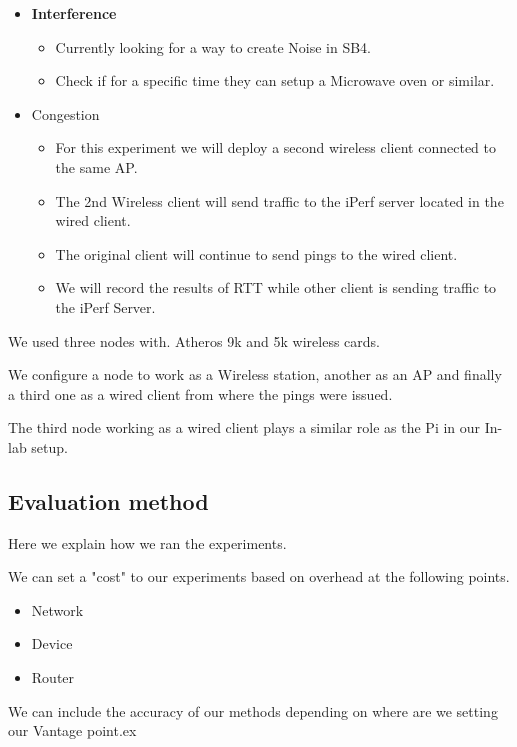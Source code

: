 \begin{itemize}
	\item \textbf{Interference}
	\begin{itemize}
		\item Currently looking for a way to create Noise in SB4.
		\item Check if for a specific time they can setup a Microwave oven or similar.
		
	\end{itemize}
	
	
	
	\item Congestion
	\begin{itemize}
		\item For this experiment we will deploy a second wireless client connected to the same AP.
		\item The 2nd Wireless client will send traffic to the iPerf server located in the wired client.
		\item The original client will continue to send pings to the wired client.
		\item We will record the results of RTT while other client is sending traffic to the iPerf Server.
		
	\end{itemize}
	
	
\end{itemize}


We used three nodes with.
Atheros 9k and 5k wireless cards.

We configure a node to work as a Wireless station, another as an AP and finally a third one as a wired client from where the pings were issued.

The third node working as a wired client plays a similar role as the Pi in our In-lab setup.


\subsection{Evaluation method}

Here we explain how we ran the experiments.

We can set a "cost" to our experiments based on overhead at the following points.

\begin{itemize}
	\item Network
	\item Device
	\item Router
\end{itemize}


We can include the accuracy of our methods depending on where are we setting our Vantage point.ex

